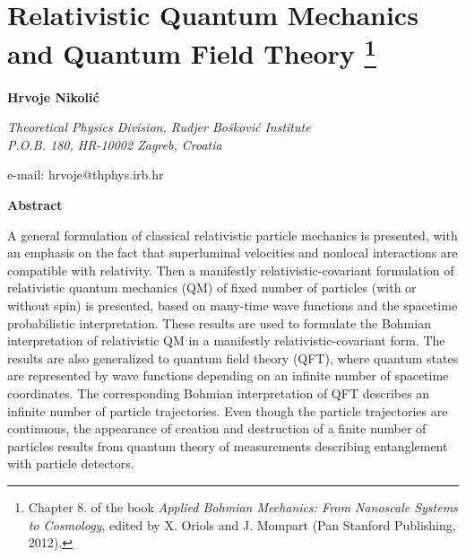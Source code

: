 \documentclass[12pt,twoside]{report} %
\begin{document}
    \setcounter{chapter}{7}



\chapter[Relativistic QM and QFT]{Relativistic Quantum Mechanics and Quantum Field Theory \footnote{Chapter 8. of the book {\it Applied Bohmian Mechanics: From Nanoscale Systems to Cosmology}, edited by X. Oriols and J. Mompart (Pan Stanford Publishing, 2012).}
\label{ch_nikolic}}




\vspace{1.0cm}

\Large
{\bf Hrvoje Nikoli\'c}
\normalsize

\vspace{1.0cm}

\noindent
{\it Theoretical Physics Division, Rudjer Bo\v{s}kovi\'c Institute \\
P.O.B. 180, HR-10002 Zagreb, Croatia}

\vspace{0.5 cm}

\noindent
e-mail: hrvoje@thphys.irb.hr

\vspace{0.5 cm}

\begin{center}
{\bf Abstract} 
\end{center}
A general formulation of classical relativistic particle mechanics is presented,
with an emphasis on the fact that superluminal velocities and nonlocal interactions
are compatible with relativity. Then a manifestly relativistic-covariant formulation 
of relativistic quantum mechanics (QM) of fixed number of particles (with or without spin) is presented,
based on many-time wave functions and the spacetime probabilistic interpretation.
These results are used to formulate the Bohmian interpretation of relativistic QM in a
manifestly relativistic-covariant form. The results are also generalized to quantum field theory (QFT),
where quantum states are represented by
wave functions depending on an infinite number of spacetime coordinates.
The corresponding Bohmian interpretation of QFT describes an infinite number
of particle trajectories. Even though the particle trajectories are continuous, 
the appearance of creation and destruction of a finite number of
particles results from quantum theory of measurements
describing entanglement with particle detectors.
\end{document}
